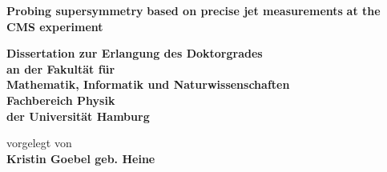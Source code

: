 \documentclass[
twoside,
headsepline,     %
headings=normal,
openright,
numbers=noenddot, %
a4paper
]{scrreprt} %
\author{Kristin Goebel}
\begin{document}
\begin{titlepage}
  \begin{center}
    \thispagestyle{empty}
    \vspace*{1cm}
    \begin{doublespace} 
       \textbf{\Huge Probing supersymmetry}
       \vskip 0.4cm
       \textbf{\Huge based on precise jet measurements}
       \vskip 0.4cm
       \textbf{\Huge at the CMS experiment}
      \vskip2.5cm
      \begin{Large} 
        \textbf{Dissertation zur Erlangung des Doktorgrades\\
          an der Fakult\"{a}t f\"{u}r \\
          Mathematik, Informatik und Naturwissenschaften\\
          Fachbereich Physik\\
          der Universit\"{a}t Hamburg\\}
      \end{Large}
      \vskip2cm
      \begin{large}
        vorgelegt von\\
        {\bf Kristin Goebel geb. Heine}\\
        \vfill
      \end{large}
    \end{doublespace} 
  \end{center}
\end{titlepage}


\newpage
\thispagestyle{empty}
\end{document}
